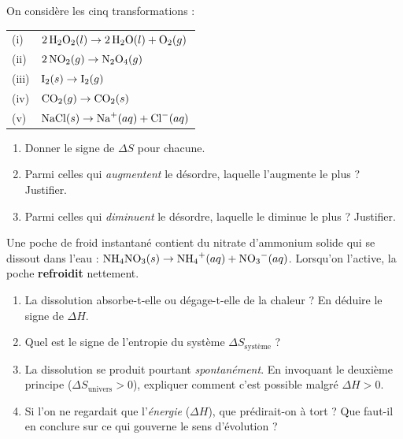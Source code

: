 \documentclass[11pt,a4paper]{article}
\newcommand{\dS}{\Delta S}
\newcommand{\dH}{\Delta H}
\begin{document}
\begin{center}
\end{center}

\begin{exercice}
On considère les cinq transformations :
\begin{center}\small
\begin{tabular}{@{}ll@{}}
(i) & $2\,\ce{H2O2}(l) \rightarrow 2\,\ce{H2O}(l) + \ce{O2}(g)$ \\
(ii) & $2\,\ce{NO2}(g) \rightarrow \ce{N2O4}(g)$ \\
(iii) & $\ce{I2}(s) \rightarrow \ce{I2}(g)$ \\
(iv) & $\ce{CO2}(g) \rightarrow \ce{CO2}(s)$ \\
(v) & $\ce{NaCl}(s) \rightarrow \ce{Na+}(aq) + \ce{Cl-}(aq)$ \\
\end{tabular}
\end{center}
\begin{enumerate}[label=\alph*),leftmargin=2em,topsep=2pt,itemsep=2pt]
  \item Donner le signe de $\dS$ pour chacune.
  \item Parmi celles qui \emph{augmentent} le désordre, laquelle l'augmente le plus ? Justifier.
  \item Parmi celles qui \emph{diminuent} le désordre, laquelle le diminue le plus ? Justifier.
\end{enumerate}
\end{exercice}

\begin{exercice}
Une poche de froid instantané contient du nitrate d'ammonium solide qui se dissout dans l'eau :
\;$\ce{NH4NO3}(s) \rightarrow \ce{NH4+}(aq) + \ce{NO3-}(aq)$.\; Lorsqu'on l'active, la poche
\textbf{refroidit} nettement.
\begin{enumerate}[label=\alph*),leftmargin=2em,topsep=2pt,itemsep=2pt]
  \item La dissolution absorbe-t-elle ou dégage-t-elle de la chaleur ? En déduire le signe de $\dH$.
  \item Quel est le signe de l'entropie du système $\dS_{\text{système}}$ ?
  \item La dissolution se produit pourtant \emph{spontanément}. En invoquant le deuxième principe
        ($\dS_{\text{univers}}>0$), expliquer comment c'est possible malgré $\dH>0$.
  \item Si l'on ne regardait que l'\emph{énergie} ($\dH$), que prédirait-on à tort ? Que faut-il en conclure
        sur ce qui gouverne le sens d'évolution ?
\end{enumerate}
\end{exercice}
\end{document}
